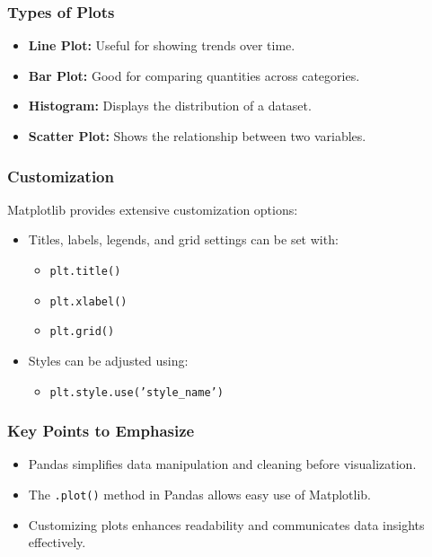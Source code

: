 \documentclass{beamer}
\begin{document}
\begin{frame}
    \frametitle{Types of Plots}
    \begin{itemize}
        \item \textbf{Line Plot:} Useful for showing trends over time.
        \item \textbf{Bar Plot:} Good for comparing quantities across categories.
        \item \textbf{Histogram:} Displays the distribution of a dataset.
        \item \textbf{Scatter Plot:} Shows the relationship between two variables.
    \end{itemize}
\end{frame}

\begin{frame}
    \frametitle{Customization}
    Matplotlib provides extensive customization options:
    \begin{itemize}
        \item Titles, labels, legends, and grid settings can be set with:
            \begin{itemize}
                \item \texttt{plt.title()}
                \item \texttt{plt.xlabel()}
                \item \texttt{plt.grid()}
            \end{itemize}
        \item Styles can be adjusted using:
            \begin{itemize}
                \item \texttt{plt.style.use('style\_name')}
            \end{itemize}
    \end{itemize}
\end{frame}

\begin{frame}
    \frametitle{Key Points to Emphasize}
    \begin{itemize}
        \item Pandas simplifies data manipulation and cleaning before visualization.
        \item The \texttt{.plot()} method in Pandas allows easy use of Matplotlib.
        \item Customizing plots enhances readability and communicates data insights effectively.
    \end{itemize}
\end{frame}
\end{document}
